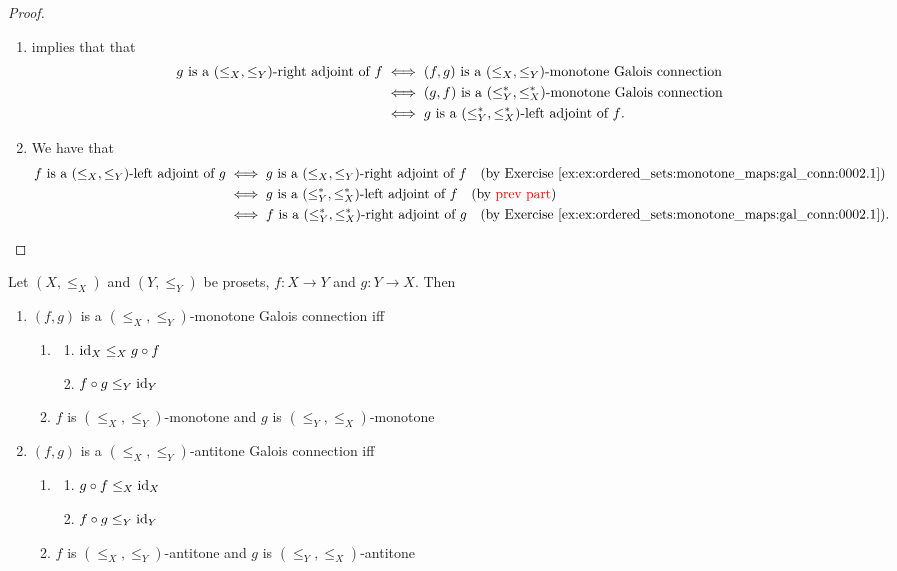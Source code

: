 \documentclass{book}
\begin{document}
	\begin{proof}\
		\begin{enumerate}
			\item {} implies that that 
			\begin{align*}
				\text{$g$ is a $(\leq_X, \leq_Y)$-right adjoint of $f$}
				& \iff \text{$(f, g)$ is a $(\leq_X, \leq_Y)$-monotone Galois connection} \\
				& \iff \text{$(g, f)$ is a $(\leq^*_Y, \leq^*_X)$-monotone Galois connection} \\ 
				& \iff \text{$g$ is a $(\leq^*_Y, \leq^*_X)$-left adjoint of $f$}.
			\end{align*}
			\item We have that 
			\begin{align*}
				\text{$f$ is a $(\leq_X, \leq_Y)$-left adjoint of $g$}
				& \iff \text{$g$ is a $(\leq_X, \leq_Y)$-right adjoint of $f$} \quad \text{(by \rex{ex:ordered_sets:monotone_maps:gal_conn:0002.1})} \\
				& \iff \text{$g$ is a $(\lop_Y, \lop_X)$-left adjoint of $f$} \quad \text{(by \tcr{prev part})} \\
				& \iff \text{$f$ is a $(\lop_Y, \lop_X)$-right adjoint of $g$} \quad \text{(by \rex{ex:ordered_sets:monotone_maps:gal_conn:0002.1})}. 
			\end{align*}
		\end{enumerate}
	\end{proof}
	
	\begin{ex} 
		Let $(X, \leq_X)$ and $(Y, \leq_Y)$ be prosets, $f: X \rightarrow Y$ and $g:Y \rightarrow X$. Then 
		\begin{enumerate}
			\item $(f,g)$ is a $(\leq_X, \leq_Y)$-monotone Galois connection iff
			\begin{enumerate}
				\item 
				\begin{enumerate}
					\item $\operatorname{id}_X \leq_X g \circ f $
					\item $f \circ g \leq_Y \operatorname{id}_Y$
				\end{enumerate}
				\item $f$ is $(\leq_X, \leq_Y)$-monotone and $g$ is $(\leq_Y, \leq_X)$-monotone
			\end{enumerate}
			\item $(f,g)$ is a $(\leq_X, \leq_Y)$-antitone Galois connection iff
			\begin{enumerate}
				\item 
				\begin{enumerate}
					\item $g \circ f \leq_X \operatorname{id}_X$
					\item $f \circ g \leq_Y \operatorname{id}_Y$
				\end{enumerate}
				\item $f$ is $(\leq_X, \leq_Y)$-antitone and $g$ is $(\leq_Y, \leq_X)$-antitone
			\end{enumerate}
		\end{enumerate}
	\end{ex}
	
\end{document}
